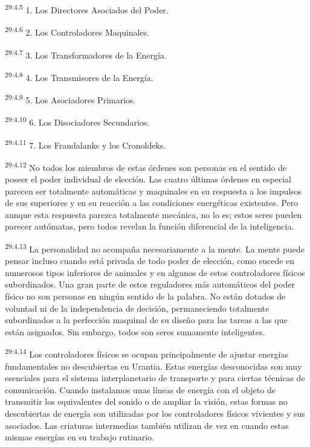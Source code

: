 \par
\textsuperscript{29:4.5} 1. Los Directores Asociados del Poder.

\par
\textsuperscript{29:4.6} 2. Los Controladores Maquinales.

\par
\textsuperscript{29:4.7} 3. Los Transformadores de la Energía.

\par
\textsuperscript{29:4.8} 4. Los Transmisores de la Energía.

\par
\textsuperscript{29:4.9} 5. Los Asociadores Primarios.

\par
\textsuperscript{29:4.10} 6. Los Disociadores Secundarios.

\par
\textsuperscript{29:4.11} 7. Los Frandalanks y los Cronoldeks.

\par
\textsuperscript{29:4.12} No todos los miembros de estas órdenes son personas en el sentido de poseer el poder individual de elección. Las cuatro últimas órdenes en especial parecen ser totalmente automáticas y maquinales en su respuesta a los impulsos de sus superiores y en su reacción a las condiciones energéticas existentes. Pero aunque esta respuesta parezca totalmente mecánica, no lo es; estos seres pueden parecer autómatas, pero todos revelan la función diferencial de la inteligencia.

\par
\textsuperscript{29:4.13} La personalidad no acompaña necesariamente a la mente. La mente puede pensar incluso cuando está privada de todo poder de elección, como sucede en numerosos tipos inferiores de animales y en algunos de estos controladores físicos subordinados. Una gran parte de estos reguladores más automáticos del poder físico no son personas en ningún sentido de la palabra. No están dotados de voluntad ni de la independencia de decisión, permaneciendo totalmente subordinados a la perfección maquinal de su diseño para las tareas a las que están asignados. Sin embargo, todos son seres sumamente inteligentes.

\par
\textsuperscript{29:4.14} Los controladores físicos se ocupan principalmente de ajustar energías fundamentales no descubiertas en Urantia. Estas energías desconocidas son muy esenciales para el sistema interplanetario de transporte y para ciertas técnicas de comunicación. Cuando instalamos unas líneas de energía con el objeto de transmitir los equivalentes del sonido o de ampliar la visión, estas formas no descubiertas de energía son utilizadas por los controladores físicos vivientes y sus asociados. Las criaturas intermedias también utilizan de vez en cuando estas mismas energías en su trabajo rutinario.

